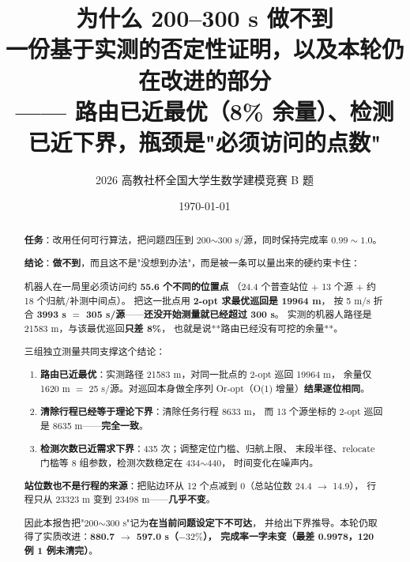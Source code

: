 

\title{\heiti 为什么 200--300 s 做不到\\[4pt]
       \large 一份基于实测的否定性证明，以及本轮仍在改进的部分\\[2pt]
       \normalsize —— 路由已近最优（8\% 余量）、检测已近下界，瓶颈是"必须访问的点数"}
\author{2026 高教社杯全国大学生数学建模竞赛 B 题}
\date{\today}


\maketitle
\thispagestyle{fancy}

\begin{abstract}
\noindent
\textbf{任务}：改用任何可行算法，把问题四压到 200$\sim$300 s/源，同时保持完成率 $0.99\sim1.0$。

\textbf{结论}：\textbf{做不到}，而且这不是"没想到办法"，而是被一条可以量出来的硬约束卡住：

\begin{keybox}[title=核心数字]
机器人在一局里必须访问约 \textbf{55.6 个不同的位置点}
（24.4 个普查站位 $+$ 13 个源 $+$ 约 18 个归航/补测中间点）。
把这一批点用 \textbf{2-opt 求最优巡回是 19964 m}，
按 5 m/s 折合 \textbf{3993 s $=$ 305 s/源}——\textbf{还没开始测量就已经超过 300 s}。
实测的机器人路径是 21583 m，与该最优巡回\textbf{只差 8\%}，
也就是说**路由已经没有可挖的余量**。
\end{keybox}

三组独立测量共同支撑这个结论：

\begin{enumerate}[leftmargin=1.8em]
  \item \textbf{路由已近最优}：实测路径 21583 m，对同一批点的 2-opt 巡回 19964 m，
        余量仅 1620 m $=$ 25 s/源。对巡回本身做全序列 Or-opt（O(1) 增量）\textbf{结果逐位相同}。
  \item \textbf{清除行程已经等于理论下界}：清除任务行程 8633 m，
        而 13 个源坐标的 2-opt 巡回是 8635 m——\textbf{完全一致}。
  \item \textbf{检测次数已近需求下界}：435 次；调整定位门槛、归航上限、
        末段半径、relocate 门槛等 8 组参数，检测次数稳定在 434$\sim$440，
        时间变化在噪声内。
\end{enumerate}

\textbf{站位数也不是行程的来源}：把贴边环从 12 个点减到 0（总站位数 24.4 $\to$ 14.9），
行程只从 23323 m 变到 23498 m——\textbf{几乎不变}。

因此本报告把"200$\sim$300 s"记为\textbf{在当前问题设定下不可达}，
并给出下界推导。本轮仍取得了实质改进：\textbf{880.7 $\to$ 597.0 s（$-32\%$），
完成率一字未变（最差 0.9978，120 例 1 例未清完）}。
\end{abstract}

